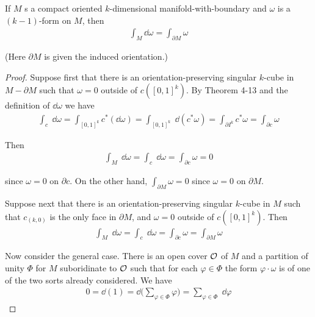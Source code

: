 \begin{theorem}
    If $M$ s a compact oriented $k$-dimensional manifold-with-boundary and $\omega$ is a
    $(k-1)$-form on $M$, then
    \begin{align*}
        \int_M\dd\omega = \int_{\partial M}\omega
    \end{align*}
\end{theorem}

(Here $\partial M$ is given the induced orientation.)


\begin{proof}
    Suppose first that there is an orientation-preserving singular $k$-cube in $M-\partial M$ such that 
    $\omega=0$ outside of $c([0,1]^k)$. By Theorem 4-13 and the definition of $\dd\omega$ we have 
    \begin{align*}
        \int_{c}\;\dd\omega
        = \int_{[0,1]^k}c^*(\dd\omega)
        = \int_{[0,1]^k}\;\dd(c^*\omega)
        = \int_{\partial I^k}c^*\omega
        = \int_{\partial c}\omega       
    \end{align*} 

    Then 
    \begin{align*}
        \int_M\;\dd\omega
        = \int_c\;\dd\omega
        = \int_{\partial c}\omega
        = 0        
    \end{align*}

    since $\omega=0$ on $\partial c$. On the other hand, $\int_{\partial M}\omega =0$ since 
    $\omega=0$ on $\partial M$.

    Suppose next that there is an orientation-preserving singular $k$-cube in $M$ such that 
    $c_{(k,0)}$ is the only face in $\partial M$, and $\omega=0$ outside of $c([0,1]^k)$. Then
    \begin{align*}
        \int_{{M}}\;\dd\omega
        = \int_{{c}}\;\dd\omega
        = \int_{{\partial c}}\omega
        = \int_{{\partial M}}\omega        
    \end{align*}

    Now consider the general case. There is an open cover $\mathcal{O}$ of $M$ and a partition of unity
    $\Phi$ for $M$ suboridinate to $\mathcal{O}$ such that for each $\varphi\in\Phi$ the form $\varphi\cdot\omega$
    is of one of the two sorts already considered. We have 
    \begin{align*}
        0 = \dd(1) = \dd\bigg(\sum_{\varphi\in\Phi}\varphi\bigg)
        = \sum_{\varphi\in\Phi}\;\dd\varphi
    \end{align*}


\end{proof}
